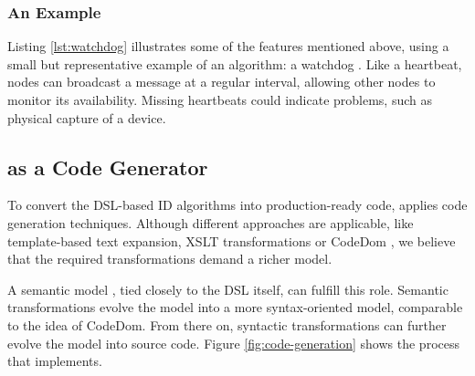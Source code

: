 \documentclass[conference]{IEEEtran}
\begin{document}
\subsubsection{An Example}

Listing \ref{lst:watchdog} illustrates some of the features mentioned above,
using a small but representative example of an algorithm: a watchdog
\cite{mishra2004intrusion}. Like a heartbeat, nodes can broadcast a message at
a regular interval, allowing other nodes to monitor its availability. Missing
heartbeats could indicate problems, such as physical capture of a device.



\subsection{\NAME as a Code Generator}
\label{code-generator-design}

To convert the DSL-based ID algorithms into production-ready code, \NAME
applies code generation techniques. Although different approaches are
applicable, like template-based text expansion, XSLT transformations or CodeDom
\cite{dollard2004code}, we believe that the required transformations demand a
richer model.

A semantic model \cite{fowler2010domain}, tied closely to the DSL itself, can
fulfill this role. Semantic transformations evolve the model into a more
syntax-oriented model, comparable to the idea of CodeDom. From there on,
syntactic transformations can further evolve the model into source code. Figure
\ref{fig:code-generation} shows the process that \NAME implements.
\end{document}
